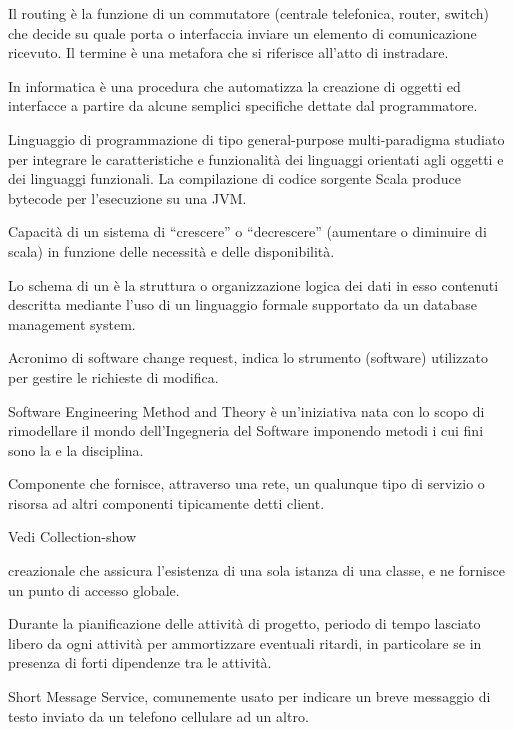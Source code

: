 Il routing è la funzione di un commutatore (centrale telefonica, router, switch) che decide su quale porta o interfaccia inviare un elemento di comunicazione ricevuto. Il termine è una metafora che si riferisce all'atto di instradare.


In informatica è una procedura che automatizza la creazione di oggetti ed interfacce a partire da alcune semplici specifiche dettate dal programmatore.

Linguaggio di programmazione di tipo general-purpose multi-paradigma studiato per integrare le caratteristiche e funzionalità dei linguaggi orientati agli oggetti e dei linguaggi funzionali. La compilazione di codice sorgente Scala produce  bytecode per l'esecuzione su una JVM.

Capacità di un sistema di ``crescere'' o ``decrescere'' (aumentare o diminuire di scala) in funzione delle necessità e delle disponibilità.

Lo schema di un  è la struttura o organizzazione logica dei dati in esso contenuti descritta mediante l'uso di un linguaggio formale supportato da un database management system.

Acronimo di software change request, indica lo strumento (software) utilizzato per gestire le richieste di modifica.

Software Engineering Method and Theory è un'iniziativa nata con lo scopo di rimodellare il mondo dell'Ingegneria del Software imponendo metodi i cui fini sono la  e la disciplina.

Componente che fornisce, attraverso una rete, un qualunque tipo di servizio o risorsa ad altri componenti tipicamente detti client.

Vedi Collection-show

 creazionale che assicura l'esistenza di una sola istanza di una classe, e ne fornisce un punto di accesso globale.

Durante la pianificazione delle attività di progetto, periodo di tempo lasciato libero da ogni attività per ammortizzare eventuali ritardi, in particolare se in presenza di forti dipendenze tra le attività.

Short Message Service, comunemente usato per indicare un breve messaggio di testo inviato da un telefono cellulare ad un altro.

